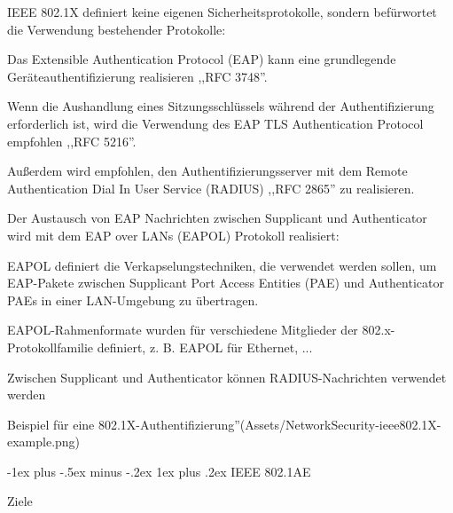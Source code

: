 \documentclass[a4paper]{article}
\makeatletter
\renewcommand{\subsubsection}{\@startsection{subsubsection}{3}{0mm}%
 {-1ex plus -.5ex minus -.2ex}%
 {1ex plus .2ex}%
 {\normalfont\small\bfseries}}
\makeatother
\begin{document}
\begin{multicols}{3}
      \begin{itemize*}
            \item IEEE 802.1X definiert keine eigenen Sicherheitsprotokolle, sondern
            befürwortet die Verwendung bestehender Protokolle:
            \begin{itemize*}
                  \item Das Extensible Authentication Protocol (EAP) kann eine grundlegende Geräteauthentifizierung realisieren ,,RFC 3748''.
                  \item Wenn die Aushandlung eines Sitzungsschlüssels während der Authentifizierung erforderlich ist, wird die Verwendung des EAP TLS Authentication Protocol empfohlen ,,RFC 5216''.
                  \item Außerdem wird empfohlen, den Authentifizierungsserver mit dem Remote Authentication Dial In User Service (RADIUS) ,,RFC 2865'' zu realisieren.
            \end{itemize*}
            \item Der Austausch von EAP Nachrichten zwischen Supplicant und
            Authenticator wird mit dem EAP over LANs (EAPOL) Protokoll realisiert:
            \begin{itemize*}
                  \item EAPOL definiert die Verkapselungstechniken, die verwendet werden sollen, um EAP-Pakete zwischen Supplicant Port Access Entities (PAE) und Authenticator PAEs in einer LAN-Umgebung zu übertragen.
                  \item EAPOL-Rahmenformate wurden für verschiedene Mitglieder der 802.x-Protokollfamilie definiert, z. B. EAPOL für Ethernet, ...
                  \item Zwischen Supplicant und Authenticator können RADIUS-Nachrichten verwendet werden
            \end{itemize*}
      \end{itemize*}

      Beispiel für eine
      802.1X-Authentifizierung''(Assets/NetworkSecurity-ieee802.1X-example.png)


      \subsubsection{IEEE 802.1AE}

      Ziele


\end{multicols}
\end{document}
